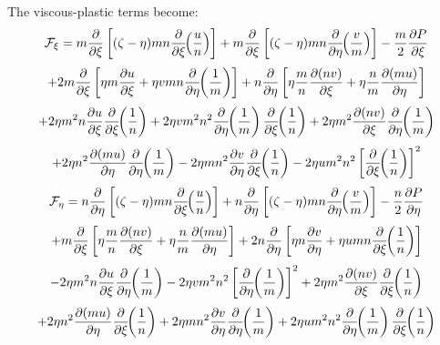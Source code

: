 The viscous-plastic terms become:
\[
   {\cal F}_{\xi} = m {\partial \over \partial \xi} \left[
   (\zeta - \eta ) mn {\partial \over \partial \xi} \!\! \left(
   {u \over n} \right) \right] +
   m {\partial \over \partial \xi} \left[
   (\zeta - \eta ) mn {\partial \over \partial \eta} \!\! \left(
   {v \over m} \right) \right] - {m \over 2}
   {\partial P \over \partial \xi}
\]
\[
   + 2 m {\partial \over \partial \xi} \left[ \eta m
   {\partial u \over \partial \xi} + \eta v mn 
   {\partial \over \partial \eta} \!\! \left( {1 \over m} \right)
   \right]
   + n {\partial \over \partial \eta} \left[ \eta {m \over n}
   {\partial (nv) \over \partial \xi} + \eta {n \over m}
   {\partial (mu) \over \partial \eta} \right]
\]
\[
   + 2 \eta m^2 n {\partial u \over \partial \xi}
   {\partial \over \partial \xi} \!\! \left( {1 \over n} \right)
   + 2 \eta v m^2 n^2
   {\partial \over \partial \eta} \!\! \left( {1 \over m} \right)
   {\partial \over \partial \xi} \!\! \left( {1 \over n} \right)
   + 2 \eta m^2 {\partial (nv) \over \partial \xi}
   {\partial \over \partial \eta} \!\! \left( {1 \over m} \right)
\]
\begin{equation}
   + 2 \eta n^2 {\partial (mu) \over \partial \eta}
   {\partial \over \partial \eta} \!\! \left( {1 \over m} \right)
   - 2 \eta m n^2 {\partial v \over \partial \eta}
   {\partial \over \partial \xi} \!\! \left( {1 \over n} \right)
   - 2 \eta u m^2 n^2 \left[
   {\partial \over \partial \xi} \!\! \left( {1 \over n} \right)
   \right]^2
\end{equation}
\vspace{2 mm}
\[
   {\cal F}_{\eta} = n {\partial \over \partial \eta} \left[
   (\zeta - \eta ) mn {\partial \over \partial \xi} \!\! \left(
   {u \over n} \right) \right] +
   n {\partial \over \partial \eta} \left[
   (\zeta - \eta ) mn {\partial \over \partial \eta} \!\! \left(
   {v \over m} \right) \right] - {n \over 2}
   {\partial P \over \partial \eta}
\]
\[
   + m {\partial \over \partial \xi} \left[ \eta {m \over n}
   {\partial (nv) \over \partial \xi} + \eta {n \over m}
   {\partial (mu) \over \partial \eta} \right]
   + 2n {\partial \over \partial \eta} \left[ \eta n
   {\partial v \over \partial \eta} + \eta u mn 
   {\partial \over \partial \xi} \!\! \left( {1 \over n} \right)
   \right]
\]
\[
   - 2 \eta m^2 n {\partial u \over \partial \xi}
   {\partial \over \partial \eta} \!\! \left( {1 \over m} \right)
   - 2 \eta v m^2 n^2 \left[
   {\partial \over \partial \eta} \!\! \left( {1 \over m} \right)
   \right]^2
   + 2 \eta m^2 {\partial (nv) \over \partial \xi}
   {\partial \over \partial \xi} \!\! \left( {1 \over n} \right)
\]
\begin{equation}
   + 2 \eta n^2 {\partial (mu) \over \partial \eta}
   {\partial \over \partial \xi} \!\! \left( {1 \over n} \right)
   + 2 \eta m n^2 {\partial v \over \partial \eta}
   {\partial \over \partial \eta} \!\! \left( {1 \over m} \right)
   + 2 \eta u m^2 n^2
   {\partial \over \partial \eta} \!\! \left( {1 \over m} \right)
   {\partial \over \partial \xi} \!\! \left( {1 \over n} \right)
\end{equation}

